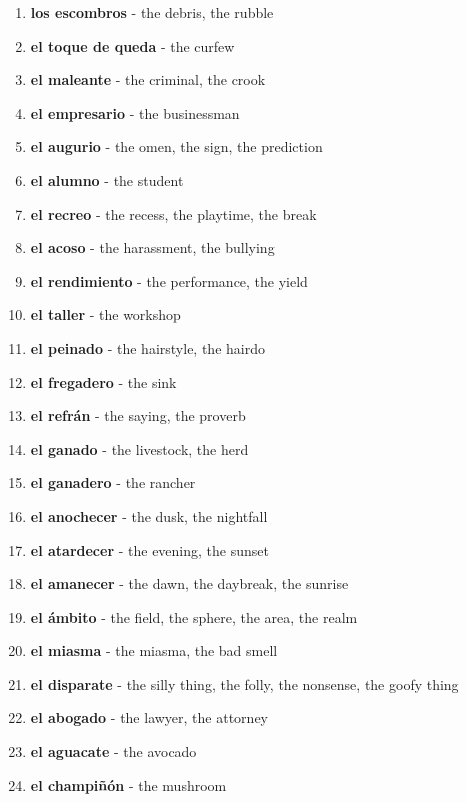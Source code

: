 \documentclass[12pt]{article}
\begin{document}
\begin{enumerate}
                \item \textbf{los escombros} - the debris, the rubble
                \item \textbf{el toque de queda} - the curfew
                \item \textbf{el maleante} - the criminal, the crook
                \item \textbf{el empresario} - the businessman
                \item \textbf{el augurio} - the omen, the sign, the prediction
                \item \textbf{el alumno} - the student
                \item \textbf{el recreo} - the recess, the playtime, the break
                \item \textbf{el acoso} - the harassment, the bullying
                \item \textbf{el rendimiento} - the performance, the yield
                \item \textbf{el taller} - the workshop
                \item \textbf{el peinado} - the hairstyle, the hairdo
                \item \textbf{el fregadero} - the sink
                \item \textbf{el refrán} - the saying, the proverb
                \item \textbf{el ganado} - the livestock, the herd
                \item \textbf{el ganadero} - the rancher
                \item \textbf{el anochecer} - the dusk, the nightfall
                \item \textbf{el atardecer} - the evening, the sunset
                \item \textbf{el amanecer} - the dawn, the daybreak, the sunrise
                \item \textbf{el ámbito} - the field, the sphere, the area, the realm
                \item \textbf{el miasma} - the miasma, the bad smell
                \item \textbf{el disparate} - the silly thing, the folly, the nonsense, the goofy thing
                \item \textbf{el abogado} - the lawyer, the attorney
                \item \textbf{el aguacate} - the avocado
                \item \textbf{el champiñón} - the mushroom

\end{enumerate}
\end{document}
